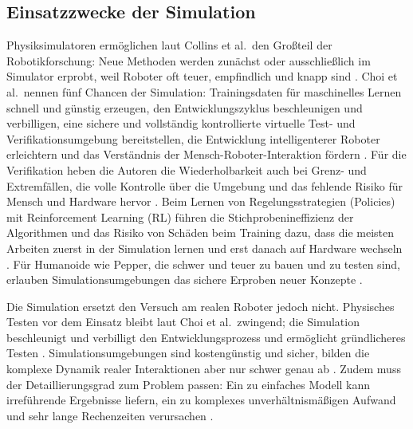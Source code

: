 \subsection{Einsatzzwecke der Simulation}
\label{sec:sim_zwecke}
Physiksimulatoren ermöglichen laut Collins et al.\ den Großteil der Robotikforschung: Neue Methoden werden zunächst oder ausschließlich im Simulator erprobt, weil Roboter oft teuer, empfindlich und knapp sind \cite{Collins2021}.
Choi et al.\ nennen fünf Chancen der Simulation: Trainingsdaten für maschinelles Lernen schnell und günstig erzeugen, den Entwicklungszyklus beschleunigen und verbilligen, eine sichere und vollständig kontrollierte virtuelle Test- und Verifikationsumgebung bereitstellen, die Entwicklung intelligenterer Roboter erleichtern und das Verständnis der Mensch-Roboter-Interaktion fördern \cite{Choi2021}.
Für die Verifikation heben die Autoren die Wiederholbarkeit auch bei Grenz- und Extremfällen, die volle Kontrolle über die Umgebung und das fehlende Risiko für Mensch und Hardware hervor \cite{Choi2021}.
Beim Lernen von Regelungsstrategien (Policies) mit Reinforcement Learning (RL) führen die Stichprobenineffizienz der Algorithmen und das Risiko von Schäden beim Training dazu, dass die meisten Arbeiten zuerst in der Simulation lernen und erst danach auf Hardware wechseln \cite{Collins2021}.
Für Humanoide wie Pepper, die schwer und teuer zu bauen und zu testen sind, erlauben Simulationsumgebungen das sichere Erproben neuer Konzepte \cite{Sekkat2024}.

Die Simulation ersetzt den Versuch am realen Roboter jedoch nicht.
Physisches Testen vor dem Einsatz bleibt laut Choi et al.\ zwingend; die Simulation beschleunigt und verbilligt den Entwicklungsprozess und ermöglicht gründlicheres Testen \cite{Choi2021}.
Simulationsumgebungen sind kostengünstig und sicher, bilden die komplexe Dynamik realer Interaktionen aber nur schwer genau ab \cite{Sekkat2024}.
Zudem muss der Detaillierungsgrad zum Problem passen: Ein zu einfaches Modell kann irreführende Ergebnisse liefern, ein zu komplexes unverhältnismäßigen Aufwand und sehr lange Rechenzeiten verursachen \cite{Choi2021}.

